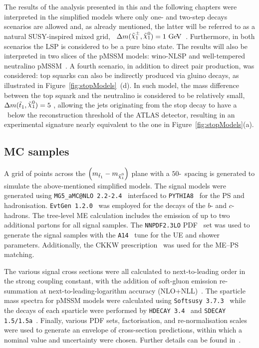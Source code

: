			The results of the analysis presented in this and the following chapters were interpreted in the simplified models where only one- and two-step decays scenarios are allowed and, as already mentioned, the latter will be referred to as a natural \ac{SUSY}-inspired mixed grid, \ie\ $\Delta m(\chinoonepm, \ninoone) = 1 \GeV$~\cite{Alwall:2008ve,Alwall:2008ag,Alves:2011wf}. Furthermore, in both scenarios the \ac{LSP} is considered to be a pure bino state. The results will also be interpreted in two slices of the \ac{pMSSM} models: wino-\ac{NLSP} and well-tempered neutralino \ac{pMSSM}~\cite{Djouadi:1998di,Berger:2008cq}.
			A fourth scenario, in addition to direct pair production, was considered: top squarks can also be indirectly produced via gluino decays, as illustrated in Figure~\ref{fig:stopModels}~(d). In such model, the mass difference between the top squark and the neutralino is considered to be relatively small, $\Delta m(\stopone, \ninoone) = 5$ \GeV, allowing the jets originating from the stop decay to have a \pt\ below the reconstruction threshold of the \ac{ATLAS} detector, resulting in an experimental signature nearly equivalent to the one in Figure~\ref{fig:stopModels}(a).


		\subsection{MC samples}

			A grid of points across the $\left(\mstopone-\mninoone\right)$ plane with a $50$-\GeV\ spacing is generated to simulate the above-mentioned simplified models. %
			The signal models were generated using \texttt{MG5\_aMC@NLO 2.2-2.4}~\cite{madgraph} interfaced to \texttt{PYTHIA8}~\cite{pythia8} for the \ac{PS} and hadronisation. \texttt{EvtGen 1.2.0}~\cite{evtGen} was employed for the decays of the  $b$- and $c$-hadrons. The tree-level \ac{ME} calculation includes the emission of up to two additional partons for all signal samples. The \texttt{NNPDF2.3LO} \ac{PDF}~\cite{PDFs} set was used to generate the signal samples with the \verb+A14+~\cite{CT10} tune for the \ac{UE} and shower parameters. Additionally, the \ac{CKKW} prescription~\cite{CKKW} was used for the \acl{ME}–\acl{PS} matching. 

			The various signal cross sections were all calculated to next-to-leading order in the strong coupling constant, with the addition of soft-gluon emission re-summation at next-to-leading-logarithm accuracy (NLO+NLL)~\cite{Beenakker:1997ut, Beenakker:2010nq, Beenakker:2011fu}. The sparticle mass spectra for \ac{pMSSM} models were calculated using \texttt{Softsusy 3.7.3}~\cite{Allanach:2001kg, Allanach:2013kza} while the decays of each sparticle were performed by \texttt{HDECAY 3.4}~\cite{hdecay} and \texttt{SDECAY 1.5/1.5a}~\cite{sdecay}. Finally, various \ac{PDF} sets, factorisation, and re-normalisation scales were used to generate an envelope of cross-section predictions, within which a nominal value and uncertainty were chosen. Further details can be found in~\cite{Borschensky:2014cia}.


